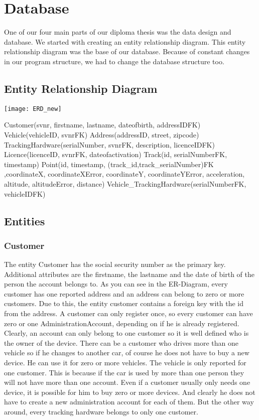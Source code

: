 \chapter{Database}
One of our four main parts of our diploma thesis was the data design and database. We started with creating an entity relationship diagram. This entity relationship diagram was the base of our database. Because of constant changes in our program structure, we had to change the database structure too. 
\section{Entity Relationship Diagram}
\begin{center}
\texttt{[image: ERD\_new]}
\end{center} 
Customer(svnr, firstname, lastname, dateofbirth, addressIDFK)\newline
Vehicle(vehicleID, svnrFK)\newline
Address(addressID, street, zipcode)\newline
TrackingHardware(serialNumber, svnrFK, description, licenceIDFK)\newline
Licence(licenceID, svnrFK, dateofactivation)\newline
Track(id, serialNumberFK, timestamp)\newline
Point(id, timestamp, (track\_id,track\_serialNumber)FK ,coordinateX, coordinateXError, coordinateY, coordinateYError, acceleration, altitude, altitudeError, distance)\newline
Vehicle\_TrackingHardware(serialNumberFK, vehicleIDFK)
\section{Entities}
\subsection{Customer}
The entity Customer has the social security number as the primary key. Additional attributes are the firstname, the lastname and the date of birth of the person the account belongs to. As you can see in the ER-Diagram, every customer has one reported address and an address can belong to zero or more customers. Due to this, the entity customer contains a foreign key with the id from the address. A customer can only register once, so every customer can have zero or one AdministrationAccount, depending on if he is already registered. Clearly, an account can only belong to one customer so it is well defined who is the owner of the device. There can be a customer who drives more than one vehicle so if he changes to another car, of course he does not have to buy a new device. He can use it for zero or more vehicles. The vehicle is only reported for one customer. This is because if the car is used by more than one person they will not have more than one account. Even if a customer usually only needs one device, it is possible for him to buy zero or more devices. And clearly he does not have to create a new administration account for each of them. But the other way around, every tracking hardware belongs to only one customer.
